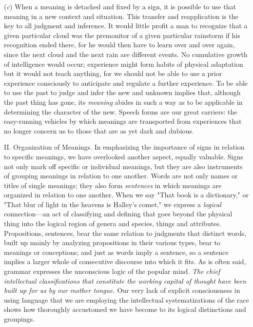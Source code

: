 \documentclass[showtrims,ustradepaper]{memoir}
\begin{document}

(\emph{c}) When a meaning is detached and fixed by a sign, it is
possible to use that meaning in a new context and situation. This
transfer and reapplication is the key to all judgment and inference. It
would little profit a man to recognize that a given particular cloud was
the premonitor of a given particular rainstorm if his recognition ended
there, for he would then have to learn over and over again, since the
next cloud and the next rain are different events. No cumulative growth
of intelligence would occur; experience might form habits of physical
adaptation but it would not teach anything, for we should not be able to
use a prior experience consciously to anticipate and regulate a further
experience. To be able to
use
the past to judge and infer the new and unknown implies that, although
the past thing has gone, its \emph{meaning} abides in such a way as to
be applicable in determining the character of the new. Speech forms are
our great carriers: the easy-running vehicles by which meanings are
transported from experiences that no longer concern us to those that are
as yet dark and dubious.


II. Organization of Meanings. In emphasizing the importance of signs in
relation to specific meanings, we have overlooked another aspect,
equally valuable. Signs not only mark off specific or individual
meanings, but they are also instruments of grouping meanings in relation
to one another. Words are not only names or titles of single meanings;
they also form \emph{sentences} in which meanings are organized in
relation to one another. When we say "That book is a dictionary," or
"That blur of light in the heavens is Halley's comet," we express a
\emph{logical} connection---an act of classifying and defining that goes
beyond the physical thing into the logical region of genera and species,
things and attributes. Propositions, sentences, bear the same relation
to judgments that distinct words, built up mainly by analyzing
propositions in their various types, bear to meanings or conceptions;
and just as words imply a sentence, so a sentence implies a larger whole
of consecutive discourse into which it fits. As is often said, grammar
expresses the unconscious logic of the popular mind. \emph{The chief
intellectual classifications that constitute the working capital of
thought have been built up for us by our mother tongue.} Our very lack
of explicit consciousness in using language that we are employing the
intellectual systematizations of the race shows how thoroughly
accustomed we have become to its logical distinctions and
groupings.
\end{document}
